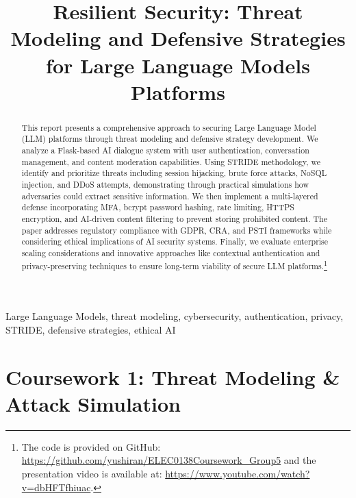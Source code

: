 \documentclass{article}
\title{Resilient Security: Threat Modeling and Defensive Strategies for Large Language Models Platforms}
\begin{document}
\maketitle
%
\begin{abstract}
    This report presents a comprehensive approach to securing Large Language Model (LLM) platforms through threat modeling and defensive strategy development. We analyze a Flask-based AI dialogue system with user authentication, conversation management, and content moderation capabilities. 
    Using STRIDE methodology, we identify and prioritize threats including session hijacking, brute force attacks, NoSQL injection, and DDoS attempts, demonstrating through practical simulations how adversaries could extract sensitive information. 
    We then implement a multi-layered defense incorporating MFA, bcrypt password hashing, rate limiting, HTTPS encryption, and AI-driven content filtering to prevent storing prohibited content. 
    The paper addresses regulatory compliance with GDPR\cite{GDPR2016}, CRA, and PSTI frameworks while considering ethical implications of AI security systems. 
    Finally, we evaluate enterprise scaling considerations and innovative approaches like contextual authentication and privacy-preserving techniques to ensure long-term viability of secure LLM platforms.\footnote{The code is provided on GitHub: \url{https://github.com/yushiran/ELEC0138Coursework_Group5} and the presentation video is available at: \url{https://www.youtube.com/watch?v=dbHFTfhiuac}.}
\end{abstract}
%
\begin{keywords}
    Large Language Models, threat modeling, cybersecurity, authentication, privacy, STRIDE, defensive strategies, ethical AI
\end{keywords}

\section{Coursework 1: Threat Modeling \& Attack Simulation}
\end{document}
